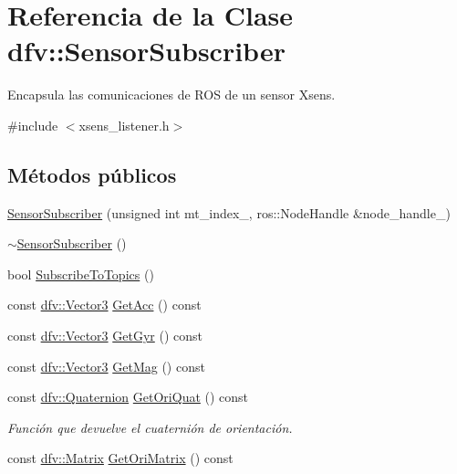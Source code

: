 \hypertarget{classdfv_1_1SensorSubscriber}{\section{\-Referencia de la \-Clase dfv\-:\-:\-Sensor\-Subscriber}
\label{classdfv_1_1SensorSubscriber}
}


\-Encapsula las comunicaciones de \-R\-O\-S de un sensor \-Xsens.  




{\ttfamily \#include $<$xsens\-\_\-listener.\-h$>$}

\subsection*{\-Métodos públicos}
\begin{DoxyCompactItemize}
\item 
\hyperlink{classdfv_1_1SensorSubscriber_a7596701a0faf0144e9c52cb09a92de86}{\-Sensor\-Subscriber} (unsigned int mt\-\_\-index\-\_\-, ros\-::\-Node\-Handle \&node\-\_\-handle\-\_\-)
\item 
\hyperlink{classdfv_1_1SensorSubscriber_aad63894472798f2e15e3f54bb8c7c78c}{$\sim$\-Sensor\-Subscriber} ()
\item 
bool \hyperlink{classdfv_1_1SensorSubscriber_ab33fdef7d3fff1bf80550a7c2f3b6889}{\-Subscribe\-To\-Topics} ()
\item 
const \hyperlink{classdfv_1_1Vector3}{dfv\-::\-Vector3} \hyperlink{classdfv_1_1SensorSubscriber_a8d90eadc91d8c97154b3d89341d5db40}{\-Get\-Acc} () const 
\item 
const \hyperlink{classdfv_1_1Vector3}{dfv\-::\-Vector3} \hyperlink{classdfv_1_1SensorSubscriber_a11fe5e8b67856541ec6a24291923dc62}{\-Get\-Gyr} () const 
\item 
const \hyperlink{classdfv_1_1Vector3}{dfv\-::\-Vector3} \hyperlink{classdfv_1_1SensorSubscriber_af6eb616df620fb7d3b9036166bb2fdf6}{\-Get\-Mag} () const 
\item 
\hypertarget{classdfv_1_1SensorSubscriber_a0e1dad84a58e4ae8708f288c8ae0082d}{const \hyperlink{classdfv_1_1Quaternion}{dfv\-::\-Quaternion} \hyperlink{classdfv_1_1SensorSubscriber_a0e1dad84a58e4ae8708f288c8ae0082d}{\-Get\-Ori\-Quat} () const }\label{classdfv_1_1SensorSubscriber_a0e1dad84a58e4ae8708f288c8ae0082d}

\begin{DoxyCompactList}\small\item\em \-Función que devuelve el cuaternión de orientación. \end{DoxyCompactList}\item 
\hypertarget{classdfv_1_1SensorSubscriber_a87b5976432890a79361a1cfc8d39f32d}{const \hyperlink{classdfv_1_1Matrix}{dfv\-::\-Matrix} \hyperlink{classdfv_1_1SensorSubscriber_a87b5976432890a79361a1cfc8d39f32d}{\-Get\-Ori\-Matrix} () const }\label{classdfv_1_1SensorSubscriber_a87b5976432890a79361a1cfc8d39f32d}


\end{DoxyCompactItemize}
